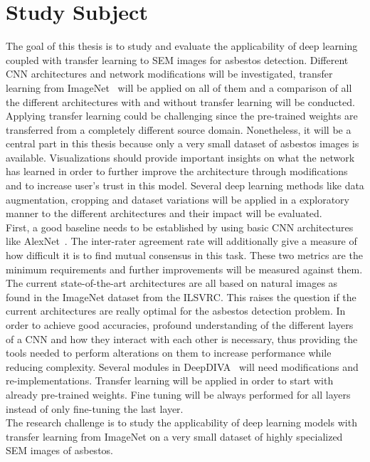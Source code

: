 \section{Study Subject}


The goal of this thesis is to study and evaluate the applicability of deep learning coupled with transfer learning to SEM images for asbestos detection. Different CNN architectures and network modifications will be investigated, transfer learning from ImageNet~\cite{imagenet} will be applied on all of them and a comparison of all the different architectures with and without transfer learning will be conducted. Applying transfer learning could be challenging since the pre-trained weights are transferred from a completely different source domain. Nonetheless, it will be a central part in this thesis because only a very small dataset of asbestos images is available. Visualizations should provide important insights on what the network has learned in order to further improve the architecture through modifications and to increase user's trust in this model. Several deep learning methods like data augmentation, cropping and dataset variations will be applied in a exploratory manner to the different architectures and their impact will be evaluated. \\

First, a good baseline needs to be established by using basic CNN architectures like AlexNet~\cite{krizhevsky2012imagenet}. The inter-rater agreement rate will additionally give a measure of how difficult it is to find mutual consensus in this task. These two metrics are the minimum requirements and further improvements will be measured against them. The current state-of-the-art architectures are all based on natural images as found in the ImageNet dataset from the ILSVRC. This raises the question if the current architectures are really optimal for the asbestos detection problem. In order to achieve good accuracies, profound understanding of the different layers of a CNN and how they interact with each other is necessary, thus providing the tools needed to perform alterations on them to increase performance while reducing complexity. Several modules in DeepDIVA~\cite{deepdiva} will need modifications and re-implementations. Transfer learning will be applied in order to start with already pre-trained weights. Fine tuning will be always performed for all layers instead of only fine-tuning the last layer.\\

The research challenge is to study the applicability of deep learning models with transfer learning from ImageNet on a very small dataset of highly specialized SEM images of asbestos.

